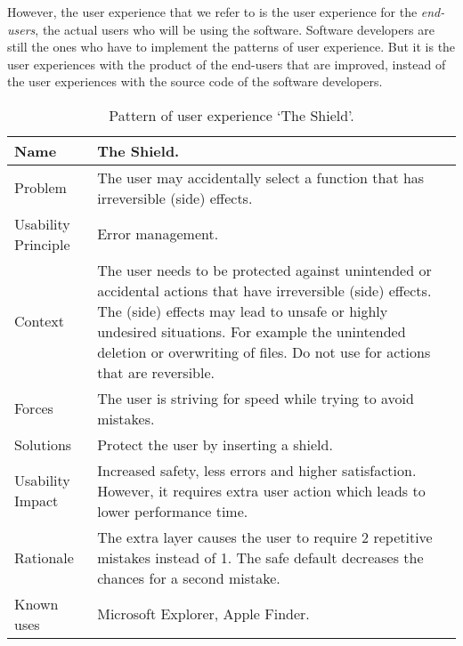 \documentclass[a4paper,titlepage]{article}
\begin{document}
However, the user experience that we refer to is the user experience
for the \textit{end-users}, the actual users who will be using the
software. Software developers are still the ones who have to implement
the patterns of user experience. But it is the user experiences with
the product of the end-users that are improved, instead of the user
experiences with the source code of the software developers.

\begin{table}[!t]
  \caption{Pattern of user experience `The Shield'.}
  \label{tab:shield}
  \begin{center}
    \begin{tabular}{| p{} || p{} |}
      \hline
      Name & The Shield. \\ \hline

      Problem & The user may accidentally select a function that has
      irreversible (side) effects. \\ \hline

      Usability Principle & Error management. \\ \hline

      Context & The user needs to be protected against unintended or
      accidental actions that have irreversible (side) effects. The
      (side) effects may lead to unsafe or highly undesired
      situations. For example the unintended deletion or overwriting
      of files. Do not use for actions that are reversible. \\ \hline

      Forces & The user is striving for speed while trying to avoid
      mistakes. \\ \hline

      Solutions & Protect the user by inserting a shield. \\ \hline

      Usability Impact & Increased safety, less errors and higher
      satisfaction. However, it requires extra user action which leads
      to lower performance time. \\ \hline

      Rationale & The extra layer causes the user to require 2
      repetitive mistakes instead of 1. The safe default decreases the
      chances for a second mistake. \\ \hline

      Known uses & Microsoft Explorer, Apple Finder. \\ \hline
    \end{tabular}
  \end{center}
\end{table}
\end{document}
